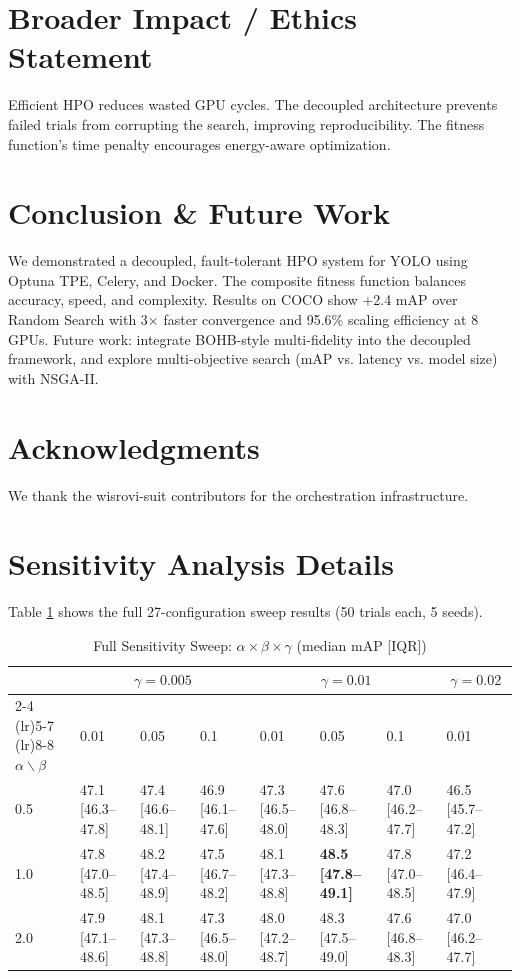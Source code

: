 \documentclass[10pt,twocolumn,letterpaper]{article}
\begin{document}
\section{Broader Impact / Ethics Statement}
Efficient HPO reduces wasted GPU cycles. The decoupled architecture prevents failed trials from corrupting the search, improving reproducibility. The fitness function's time penalty encourages energy-aware optimization.

\section{Conclusion \& Future Work}
We demonstrated a decoupled, fault-tolerant HPO system for YOLO using Optuna TPE, Celery, and Docker. The composite fitness function balances accuracy, speed, and complexity. Results on COCO show +2.4 mAP over Random Search with 3$\times$ faster convergence and 95.6\% scaling efficiency at 8 GPUs. Future work: integrate BOHB-style multi-fidelity into the decoupled framework, and explore multi-objective search (mAP vs. latency vs. model size) with NSGA-II.

\section{Acknowledgments}
We thank the wisrovi-suit contributors for the orchestration infrastructure.

\appendix
\section{Sensitivity Analysis Details}
\label{app:sensitivity}
Table \ref{tab:sensitivity_full} shows the full 27-configuration sweep results (50 trials each, 5 seeds).

\begin{table}[htbp]
\centering
\caption{Full Sensitivity Sweep: $\alpha \times \beta \times \gamma$ (median mAP [IQR])}
\label{tab:sensitivity_full}
\begin{tabular}{@{}llllllll@{}}
\toprule
& \multicolumn{3}{c}{$\gamma=0.005$} & \multicolumn{3}{c}{$\gamma=0.01$} & \multicolumn{1}{c}{$\gamma=0.02$} \\ \cmidrule(lr){2-4} \cmidrule(lr){5-7} \cmidrule(lr){8-8}
$\alpha \backslash \beta$ & 0.01 & 0.05 & 0.1 & 0.01 & 0.05 & 0.1 & 0.01 \\ \midrule
0.5 & 47.1 [46.3--47.8] & 47.4 [46.6--48.1] & 46.9 [46.1--47.6] & 47.3 [46.5--48.0] & 47.6 [46.8--48.3] & 47.0 [46.2--47.7] & 46.5 [45.7--47.2] \\
1.0 & 47.8 [47.0--48.5] & 48.2 [47.4--48.9] & 47.5 [46.7--48.2] & 48.1 [47.3--48.8] & \textbf{48.5 [47.8--49.1]} & 47.8 [47.0--48.5] & 47.2 [46.4--47.9] \\
2.0 & 47.9 [47.1--48.6] & 48.1 [47.3--48.8] & 47.3 [46.5--48.0] & 48.0 [47.2--48.7] & 48.3 [47.5--49.0] & 47.6 [46.8--48.3] & 47.0 [46.2--47.7] \\ \bottomrule
\end{tabular}
\end{table}
\end{document}
